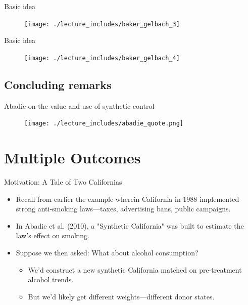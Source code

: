 \documentclass{beamer}
\begin{document}
\begin{frame}{Basic idea}

\begin{figure}
\texttt{[image: ./lecture\_includes/baker\_gelbach\_3]}
\end{figure}
\end{frame}

\begin{frame}{Basic idea}

\begin{figure}
\texttt{[image: ./lecture\_includes/baker\_gelbach\_4]}
\end{figure}
\end{frame}

\subsection{Concluding remarks}


\begin{frame}{Abadie on the value and use of synthetic control}

	\begin{figure}
	\texttt{[image: ./lecture\_includes/abadie\_quote.png]}
	\end{figure}

\end{frame}



\section{Multiple Outcomes}

\begin{frame}{Motivation: A Tale of Two Californias}
  \begin{itemize}
    \item Recall from earlier the example wherein California in 1988 implemented strong anti-smoking laws—taxes, advertising bans, public campaigns.
    \item In Abadie et al. (2010), a "Synthetic California" was built to estimate the law's effect on smoking.
    \item Suppose we then asked: What about alcohol consumption?
    \begin{itemize}
      \item We'd construct a new synthetic California matched on pre-treatment alcohol trends.
      \item But we'd likely get different weights—different donor states.
    \end{itemize}
  \end{itemize}
\end{frame}
\end{document}
